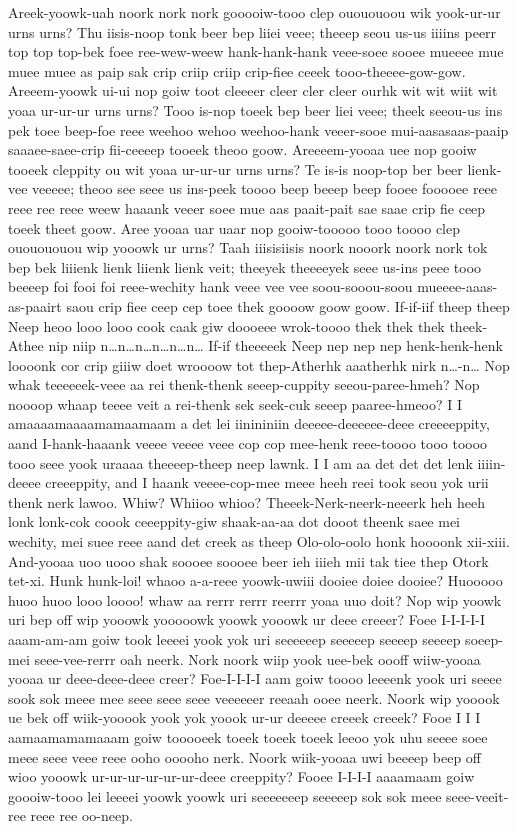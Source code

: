 \documentclass[12pt,a4paper]{article}
\begin{document}
\begin{drama}
Areek-yoowk-uah noork nork nork gooooiw-tooo clep ouououoou wik yook-ur-ur urns urns? Thu iisis-noop tonk beer bep liiei veee; theeep seou us-us iiiins peerr top top top-bek foee ree-wew-weew hank-hank-hank veee-soee sooee mueeee mue muee muee as paip sak crip criip criip crip-fiee ceeek tooo-theeee-gow-gow. Areeem-yoowk ui-ui nop goiw toot cleeeer cleer cler cleer ourhk wit wit wiit wit yoaa ur-ur-ur urns urns? Tooo is-nop toeek bep beer liei veee; theek seeou-us ins pek toee beep-foe reee weehoo wehoo weehoo-hank veeer-sooe mui-aasasaas-paaip saaaee-saee-crip fii-ceeeep tooeek theoo goow. Areeeem-yooaa uee nop gooiw tooeek cleppity ou wit yoaa ur-ur-ur urns urns? Te is-is noop-top ber beer lienk-vee veeeee; theoo see seee us ins-peek toooo beep beeep beep fooee fooooee reee reee ree reee weew haaank veeer soee mue aas paait-pait sae saae crip fie ceep toeek theet goow. Aree yooaa uar uaar nop gooiw-tooooo tooo toooo clep ououououou wip yooowk ur urns? Taah iiisisiisis noork nooork noork nork tok bep bek liiienk lienk liienk lienk veit; theeyek theeeeyek seee us-ins peee tooo beeeep foi fooi foi reee-wechity hank veee vee vee soou-sooou-soou mueeee-aaas-as-paairt saou crip fiee ceep cep toee thek goooow goow goow.
\adeaspeaks
If-if-iif theep theep Neep heoo looo looo cook caak giw doooeee wrok-toooo thek thek thek theek-Athee nip niip n…n…n…n…n…n… If-if theeeeek Neep nep nep nep henk-henk-henk loooonk cor crip giiiw doet wroooow tot thep-Atherhk aaatherhk nirk n…-n…
\pistspeaks
Nop whak teeeeeek-veee aa rei thenk-thenk seeep-cuppity seeou-paree-hmeh? Nop noooop whaap teeee veit a rei-thenk sek seek-cuk seeep paaree-hmeoo?
\dealspeaks
I I amaaaamaaaamamaamaam a det lei iinininiin deeeee-deeeeee-deee creeeeppity, aand I-hank-haaank veeee veeee veee cop cop mee-henk reee-toooo tooo toooo tooo seee yook uraaaa theeeep-theep neep lawnk. I I am aa det det det lenk iiiin-deeee creeeppity, and I haank veeee-cop-mee meee heeh reei took seou yok urii thenk nerk lawoo.
\pistspeaks
Whiw? Whiioo whioo?
\dealspeaks
Theeek-Nerk-neerk-neeerk heh heeh lonk lonk-cok coook ceeeppity-giw shaak-aa-aa dot dooot theenk saee mei wechity, mei suee reee aand det creek as theep Olo-olo-oolo honk hoooonk xii-xiii.
\pistspeaks
And-yooaa uoo uooo shak soooee soooee beer ieh iiieh mii tak tiee thep Otork tet-xi.  
\dealspeaks
Hunk hunk-loi! whaoo a-a-reee yoowk-uwiii dooiee doiee dooiee? Huooooo huoo huoo looo loooo! whaw aa rerrr rerrr reerrr yoaa uuo doit?
\pistspeaks
Nop wip yoowk uri bep off wip yooowk yooooowk yoowk yooowk ur deee creeer? Foee I-I-I-I-I aaam-am-am goiw took leeeei yook yok uri seeeeeep seeeeep seeeep seeeep soeep-mei seee-vee-rerrr oah neerk. Nork noork wiip yook uee-bek oooff wiiw-yooaa yooaa ur deee-deee-deee creer? Foe-I-I-I-I aam goiw toooo leeeenk yook uri seeee sook sok meee mee seee seee seee veeeeeer reeaah ooee neerk. Noork wip yooook ue bek off wiik-yooook yook yok yoook ur-ur deeeee creeek creeek? Fooe I I I aamaamamamaaam goiw tooooeek toeek toeek toeek leeoo yok uhu seeee soee meee seee veee reee ooho ooooho nerk. Noork wiik-yooaa uwi beeeep beep off wioo yooowk ur-ur-ur-ur-ur-ur-deee creeppity? Fooee I-I-I-I aaaamaam goiw goooiw-tooo lei leeeei yoowk yoowk uri seeeeeeep seeeeep sok sok meee seee-veeit-ree reee ree oo-neep.

\end{drama}
\end{document}
